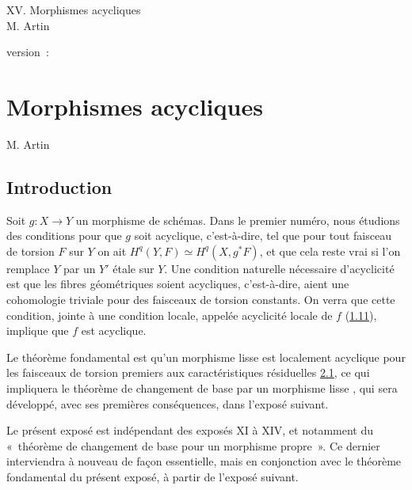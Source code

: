 \documentclass[10pt]{../fichiers-configuration-latex/smfart}
\begin{document}
\begin{center}
XV. Morphismes acycliques\\
M. Artin 
\end{center}

version : \showgitstatus{}
\tableofcontents

\else
\chapter{Morphismes acycliques}
\begin{center}
M. Artin 
\end{center}
\fi

\setcounter{pageoriginal}{167}


\section*{Introduction}\pageoriginale

Soit $g:X\rightarrow Y$ un morphisme de schémas. Dans le premier
numéro, nous étudions des conditions pour que $g$ soit acyclique,
c'est-à-dire, tel que pour tout faisceau de torsion $F$ sur $Y$ on ait
$H^{q}(Y,F)\simeq H^{q}(X,g^{\ast}F)$, et que cela reste vrai si l'on
remplace $Y$ par un $Y'$ étale sur $Y$. Une condition naturelle
nécessaire d'acyclicité est que les fibres géométriques soient
acycliques, c'est-à-dire, aient une cohomologie triviale pour des
faisceaux de torsion constants. On verra que cette condition, jointe à
une condition locale, appelée acyclicité locale de $f$ (\hyperref[XV.def1.11]{1.11}), implique
que $f$ est acyclique.

Le théorème fondamental est qu'un morphisme lisse est localement
acyclique pour les faisceaux de torsion premiers aux caractéristiques
résiduelles \hyperref[XV.thm2.1]{2.1}, ce qui impliquera le théorème de
changement de base 
par un morphisme lisse , qui sera développé, avec ses premières
conséquences, dans l'exposé suivant.

Le présent exposé est indépendant des exposés XI à XIV, et notamment
du « théorème de changement de base pour un morphisme propre ». Ce
dernier interviendra à nouveau de façon essentielle, mais en
conjonction avec le théorème fondamental du présent exposé, à partir
de l'exposé suivant.
\end{document}
